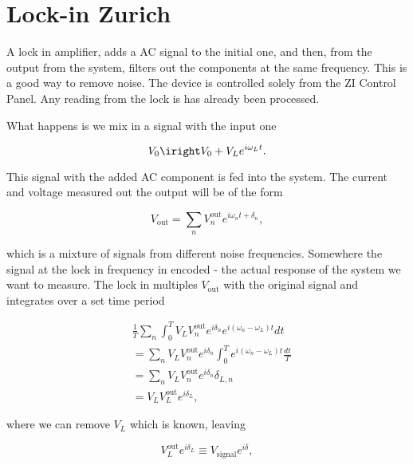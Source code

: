 \section{Lock-in Zurich}
  A lock in amplifier, adds a AC signal to the initial one, and then, from the output from the system, filters out the components at the same frequency. This is a good way to remove noise. The device is controlled solely from the ZI Control Panel. Any reading from the lock is has already been processed.
  
  What happens is we mix in a signal with the input one
  
  \begin{equation}\label{key}
  	V_0 \iright V_0+V_{L}e^{i\omega_{L}t}.
  \end{equation}
  
  \noindent This signal with the added AC component is fed into the system. The current and voltage measured out the output will be of the form
  
  \begin{equation}\label{key}
  	V_{\text{out}} = \sum_{n}V_n^{\text{out}}e^{i\omega_n t+\delta_n},
  \end{equation}
  
  \noindent which is a mixture of signals from different noise frequencies. Somewhere the signal at the lock in frequency in encoded - the actual response of the system we want to measure. The lock in multiples $ V_{\text{out}} $ with the original signal and integrates over a set time period
  
  \begin{equation}\label{key}
  	\begin{aligned}
  	& \frac{1}{T}\sum_n \int_{0}^{T}V_{L}V^{\text{out}}_ne^{i\delta_n}e^{i(\omega_n - \omega_{L})t}dt
  	\\& = \sum_n V_{L}V^{\text{out}}_ne^{i\delta_{n}}\int_{0}^{T}e^{i(\omega_n - \omega_{L})t}\frac{dt}{T}
  	\\& = \sum_n V_{L}V^{\text{out}}_ne^{i\delta_{n}}\delta_{L,n}
  	\\& = V_{L}V^{\text{out}}_Le^{i\delta_L},
  	\end{aligned}
  \end{equation}
  
  \noindent where we can remove $ V_L $ which is known, leaving
  
  \begin{equation}\label{key}
  	V_{L}^{\text{out}}e^{i\delta_L} \equiv V_{\text{signal}}e^{i\delta},
  \end{equation}
  
